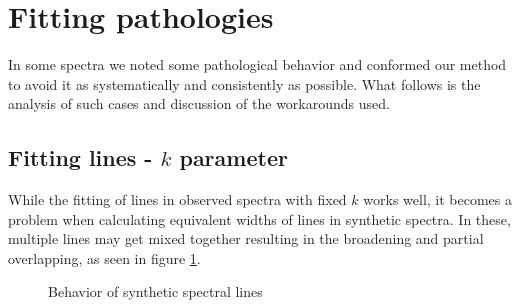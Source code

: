 \documentclass{aa}
\begin{document}
\section{Fitting pathologies}

In some spectra we noted some pathological behavior and conformed our method
to avoid it as systematically and consistently as possible. What follows is the
analysis of such cases and discussion of the workarounds used.

\subsection{Fitting lines - $k$ parameter}
\label{sec:k}

While the fitting of lines in observed spectra with fixed $k$ works well, it
becomes a problem when calculating equivalent widths of lines in synthetic
spectra. In these, multiple lines may get mixed together resulting in the
broadening and partial overlapping, as seen in figure \ref{fig:bad_synth_lines}.

\begin{figure}[h]
  \caption{Behavior of synthetic spectral lines}
  \label{fig:bad_synth_lines}
\end{figure}
\end{document}
